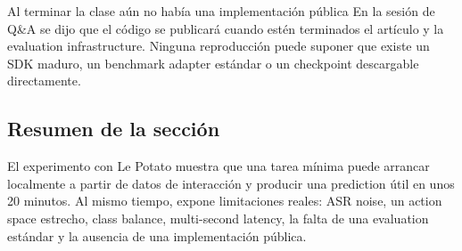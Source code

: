 \begin{warningbox}{Al terminar la clase aún no había una implementación pública}
En la sesión de Q\&A se dijo que el código se publicará cuando estén terminados el artículo y la evaluation infrastructure. Ninguna reproducción puede suponer que existe un SDK maduro, un benchmark adapter estándar o un checkpoint descargable directamente.
\end{warningbox}



\subsection{Resumen de la sección}

El experimento con Le Potato muestra que una tarea mínima puede arrancar localmente a partir de datos de interacción y producir una prediction útil en unos 20 minutos. Al mismo tiempo, expone limitaciones reales: ASR noise, un action space estrecho, class balance, multi-second latency, la falta de una evaluation estándar y la ausencia de una implementación pública.
